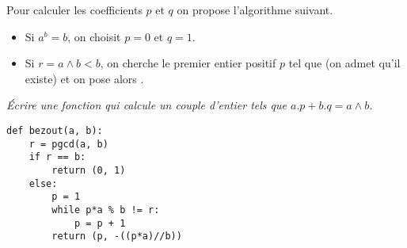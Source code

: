 Pour calculer les coefficients $p$ et $q$ on propose l'algorithme suivant.
\begin{itemize}
    \item Si $a^b=b$, on choisit $p = 0$ et $q = 1$.
    \item Si $r = a\wedge b < b$, on cherche le premier entier positif $p$ tel que  (on admet qu'il existe) et on pose alors . 
\end{itemize}
\begin{Exercise}[title = Coefficients de Bezout]
\it Écrire une fonction  qui calcule un couple d'entier  tels que $a.p + b.q = a\wedge b$.
\end{Exercise}
\begin{Answer}
\begin{lstlisting}
def bezout(a, b):
    r = pgcd(a, b)
    if r == b:
        return (0, 1)
    else:
        p = 1
        while p*a % b != r:
            p = p + 1
        return (p, -((p*a)//b))
\end{lstlisting}
\end{Answer}
